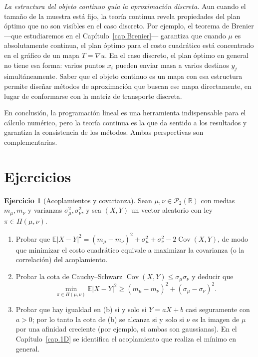 \documentclass[12pt, a4paper]{amsbook}
\newcommand{\R}{{\mathbb R}}
\newcommand{\E}{{\mathbb E}}
\theoremstyle{remark}
\theoremstyle{definition}
\newtheorem{ejercicio}{Ejercicio}[chapter]
\numberwithin{section}{chapter}
\numberwithin{subsection}{section}
\numberwithin{equation}{section}
\numberwithin{figure}{chapter}
\begin{document}
\medskip
\emph{La estructura del objeto continuo guía la aproximación discreta.}
Aun cuando el tamaño de la muestra está fijo, la teoría continua revela
propiedades del plan óptimo que no son visibles en el caso discreto. Por
ejemplo, el teorema de Brenier —que estudiaremos en el
Capítulo~\ref{cap.Brenier}— garantiza que cuando $\mu$ es absolutamente
continua, el plan óptimo para el costo cuadrático está concentrado en el
gráfico de un mapa $T=\nabla u$. En el caso discreto, el plan óptimo
en general no tiene esa forma: varios puntos $x_i$ pueden enviar masa a
varios destinos $y_j$ simultáneamente. Saber que el objeto continuo es un
mapa con esa estructura permite diseñar métodos de aproximación que buscan
ese mapa directamente, en lugar de conformarse con la matriz de transporte
discreta.

\medskip
En conclusión, la programación lineal es una herramienta indispensable para
el cálculo numérico, pero la teoría continua es la que da sentido a los
resultados y garantiza la consistencia de los métodos. Ambas perspectivas
son complementarias.
 
 

\section*{Ejercicios}

\begin{ejercicio}[Acoplamientos y covarianza]\label{ejer.acoplamiento.covarianza}
Sean $\mu,\nu\in\mathcal P_2(\R)$ con medias $m_\mu,m_\nu$ y varianzas
$\sigma_\mu^2,\sigma_\nu^2$, y sea $(X,Y)$ un vector aleatorio con ley
$\pi\in\Pi(\mu,\nu)$.
\begin{enumerate}[label=(\alph*)]
\item Probar que
$\E|X-Y|^2=(m_\mu-m_\nu)^2+\sigma_\mu^2+\sigma_\nu^2-2\operatorname{Cov}(X,Y)$,
de modo que minimizar el costo cuadrático equivale a maximizar la
covarianza (o la correlación) del acoplamiento.
\item Probar la cota de Cauchy--Schwarz
$\operatorname{Cov}(X,Y)\le\sigma_\mu\sigma_\nu$ y deducir que
\[
\min_{\pi\in\Pi(\mu,\nu)}\E|X-Y|^2\ge(m_\mu-m_\nu)^2+(\sigma_\mu-\sigma_\nu)^2 .
\]
\item Probar que hay igualdad en (b) si y solo si $Y=aX+b$ casi seguramente
con $a>0$; por lo tanto la cota de (b) se alcanza si y solo si $\nu$ es la
imagen de $\mu$ por una afinidad creciente (por ejemplo, si ambas son
gaussianas). En el Capítulo~\ref{cap.1D} se identifica el acoplamiento que
realiza el mínimo en general.
\end{enumerate}
\end{ejercicio}
\end{document}
